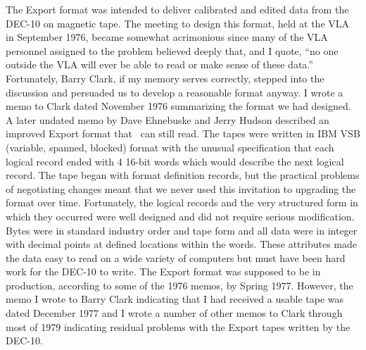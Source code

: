 The Export format was intended to deliver calibrated and edited data
from the DEC-10 on magnetic tape.  The meeting to design this format,
held at the VLA in September 1976, became somewhat acrimonious since
many of the VLA personnel assigned to the problem believed deeply
that, and I quote, ``no one outside the VLA will ever be able to read
or make sense of these data.''  Fortunately, Barry Clark, if my memory
serves correctly, stepped into the discussion and persuaded us to
develop a reasonable format anyway.  I wrote a memo to Clark dated
November 1976 summarizing the format we had designed.  A later undated
memo by Dave Ehnebuske and Jerry Hudson described an improved Export
format that \AIPS\ can still read.  The tapes were written in IBM VSB
(variable, spanned, blocked) format with the unusual specification
that each logical record ended with 4 16-bit words which would
describe the next logical record.  The tape began with format
definition records, but the practical problems of negotiating changes
meant that we never used this invitation to upgrading the format over
time.  Fortunately, the logical records and the very structured form
in which they occurred were well designed and did not require serious
modification.  Bytes were in standard industry order and tape form and
all data were in integer with decimal points at defined locations
within the words.  These attributes made the data easy to read on a
wide variety of computers but must have been hard work for the DEC-10
to write.  The Export format was supposed to be in production,
according to some of the 1976 memos, by Spring 1977. However, the
memo I wrote to Barry Clark indicating that I had received a usable
tape was dated December 1977 and I wrote a number of other memos to
Clark through most of 1979 indicating residual problems with the
Export tapes written by the DEC-10.

